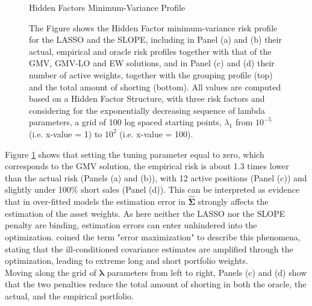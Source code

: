 \documentclass[12pt, a4paper]{article}
\newcommand{\bfSigma}{\boldsymbol{\Sigma} }
\newcommand{\bflambda}{\boldsymbol{\lambda}}
\begin{document}
\begin{figure}[h!]
\centering
\caption{Hidden Factors Minimum-Variance Profile}\label{RiskProfile_HiddenFactors_MinVar}
\captionsetup{font=scriptsize,labelfont=scriptsize, width=\textwidth}
     \caption*{The Figure shows the Hidden Factor minimum-variance risk profile for the LASSO and  the SLOPE, including in Panel (a) and (b) their actual, empirical and oracle risk profiles together with that of the GMV, GMV-LO and EW solutions, and in Panel (c) and (d) their number of active weights, together with the grouping profile (top) and the total amount of shorting (bottom). All values are computed based on a Hidden Factor Structure, with three risk factors and considering for the exponentially decreasing sequence of lambda parameters, a grid of 100 log spaced starting points, $\lambda_{1}$ from $10^{-5}$ (i.e. x-value = 1) to $10^{2}$ (i.e. x-value = 100).}
\end{figure}
%
Figure \ref{RiskProfile_HiddenFactors_MinVar} shows that setting the tuning parameter equal to zero, which corresponds to the GMV solution, the empirical risk is about 1.3 times lower than the actual risk (Panels (a) and (b)), with 12 active positions (Panel (c)) and slightly under 100\% short sales (Panel (d)). This can be interpreted as evidence %
that in over-fitted models the estimation error in $\widehat{\bfSigma}$ strongly affects the estimation of the asset weights.
As here neither the LASSO nor the SLOPE penalty are binding, estimation errors can enter unhindered into the optimization. \cite{Michaud1989} coined the term "error maximization" to describe this phenomena, stating that the ill-conditioned covariance estimates are amplified through the optimization, leading to extreme long and short portfolio weights.\\
Moving along the grid of $\bflambda$ parameters from left to right, Panels (c) and (d) show that the two penalties reduce the total amount of shorting in both the oracle, the actual, and the empirical portfolio.
\end{document}
